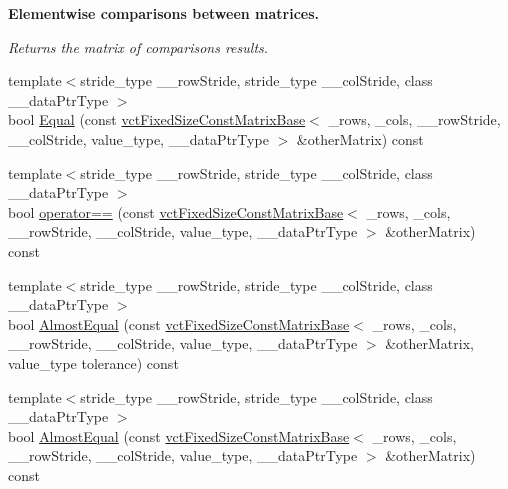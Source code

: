 \begin{Indent}{\bf Elementwise comparisons between matrices.}\par
{\em Returns the matrix of comparison\textquotesingle{}s results. }\begin{DoxyCompactItemize}
\item 
{\footnotesize template$<$stride\+\_\+type \+\_\+\+\_\+row\+Stride, stride\+\_\+type \+\_\+\+\_\+col\+Stride, class \+\_\+\+\_\+data\+Ptr\+Type $>$ }\\bool \hyperlink{classvct_fixed_size_const_matrix_base_aac6b4cbb54feb3450720c226831c1a66}{Equal} (const \hyperlink{classvct_fixed_size_const_matrix_base}{vct\+Fixed\+Size\+Const\+Matrix\+Base}$<$ \+\_\+rows, \+\_\+cols, \+\_\+\+\_\+row\+Stride, \+\_\+\+\_\+col\+Stride, value\+\_\+type, \+\_\+\+\_\+data\+Ptr\+Type $>$ \&other\+Matrix) const 
\item 
{\footnotesize template$<$stride\+\_\+type \+\_\+\+\_\+row\+Stride, stride\+\_\+type \+\_\+\+\_\+col\+Stride, class \+\_\+\+\_\+data\+Ptr\+Type $>$ }\\bool \hyperlink{classvct_fixed_size_const_matrix_base_a9aaae9474065f05fab6384ed1d6f1c3e}{operator==} (const \hyperlink{classvct_fixed_size_const_matrix_base}{vct\+Fixed\+Size\+Const\+Matrix\+Base}$<$ \+\_\+rows, \+\_\+cols, \+\_\+\+\_\+row\+Stride, \+\_\+\+\_\+col\+Stride, value\+\_\+type, \+\_\+\+\_\+data\+Ptr\+Type $>$ \&other\+Matrix) const 
\item 
{\footnotesize template$<$stride\+\_\+type \+\_\+\+\_\+row\+Stride, stride\+\_\+type \+\_\+\+\_\+col\+Stride, class \+\_\+\+\_\+data\+Ptr\+Type $>$ }\\bool \hyperlink{classvct_fixed_size_const_matrix_base_ac068ac0c312282e0efa2c5f30eb18809}{Almost\+Equal} (const \hyperlink{classvct_fixed_size_const_matrix_base}{vct\+Fixed\+Size\+Const\+Matrix\+Base}$<$ \+\_\+rows, \+\_\+cols, \+\_\+\+\_\+row\+Stride, \+\_\+\+\_\+col\+Stride, value\+\_\+type, \+\_\+\+\_\+data\+Ptr\+Type $>$ \&other\+Matrix, value\+\_\+type tolerance) const 
\item 
{\footnotesize template$<$stride\+\_\+type \+\_\+\+\_\+row\+Stride, stride\+\_\+type \+\_\+\+\_\+col\+Stride, class \+\_\+\+\_\+data\+Ptr\+Type $>$ }\\bool \hyperlink{classvct_fixed_size_const_matrix_base_ac0a5e5006900f52e8eb60af04434aef1}{Almost\+Equal} (const \hyperlink{classvct_fixed_size_const_matrix_base}{vct\+Fixed\+Size\+Const\+Matrix\+Base}$<$ \+\_\+rows, \+\_\+cols, \+\_\+\+\_\+row\+Stride, \+\_\+\+\_\+col\+Stride, value\+\_\+type, \+\_\+\+\_\+data\+Ptr\+Type $>$ \&other\+Matrix) const 

\end{DoxyCompactItemize}
\end{Indent}

